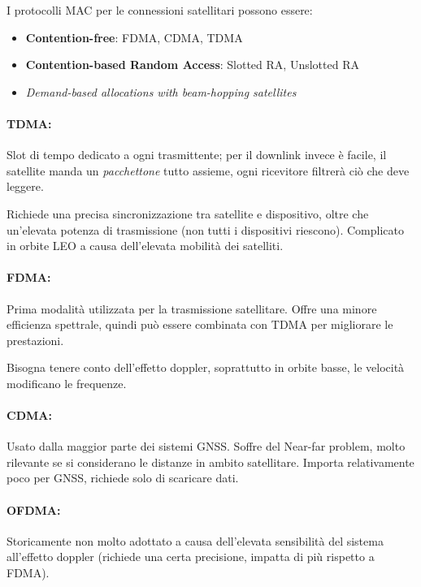 I protocolli MAC per le connessioni satellitari possono essere: 
\begin{itemize}
	\item \textbf{Contention-free}: FDMA, CDMA, TDMA
	
    \item \textbf{Contention-based Random Access}: Slotted RA, Unslotted RA
	
    \item \textit{Demand-based allocations with beam-hopping satellites}
\end{itemize}

\paragraph{TDMA:} Slot di tempo dedicato a ogni trasmittente; per il downlink invece è facile, il satellite manda un \textit{pacchettone} tutto assieme, ogni ricevitore filtrerà ciò che deve leggere.

Richiede una precisa sincronizzazione tra satellite e dispositivo, oltre che un'elevata potenza di trasmissione (non tutti i dispositivi riescono). Complicato in orbite LEO a causa dell'elevata mobilità dei satelliti.

\paragraph{FDMA:} Prima modalità utilizzata per la trasmissione satellitare. Offre una minore efficienza spettrale, quindi può essere combinata con TDMA per migliorare le prestazioni.

Bisogna tenere conto dell'effetto doppler, soprattutto in orbite basse, le velocità modificano le frequenze. 

\paragraph{CDMA:} Usato dalla maggior parte dei sistemi GNSS. Soffre del Near-far problem, molto rilevante se si considerano le distanze in ambito satellitare. Importa relativamente poco per GNSS, richiede solo di scaricare dati.

\paragraph{OFDMA:} Storicamente non molto adottato a causa dell'elevata sensibilità del sistema all'effetto doppler (richiede una certa precisione, impatta di più rispetto a FDMA).

